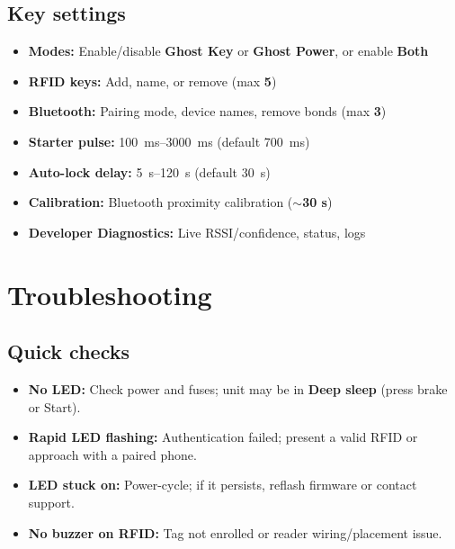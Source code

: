 \documentclass[11pt]{article}
\begin{document}
\subsection{Key settings}
\begin{itemize}
  \item \textbf{Modes:} Enable/disable \textbf{Ghost Key} or \textbf{Ghost Power}, or enable \textbf{Both}
  \item \textbf{RFID keys:} Add, name, or remove (max \textbf{5})
  \item \textbf{Bluetooth:} Pairing mode, device names, remove bonds (max \textbf{3})
  \item \textbf{Starter pulse:} \SI{100}{\milli\second}--\SI{3000}{\milli\second} (default \SI{700}{\milli\second})
  \item \textbf{Auto-lock delay:} \SI{5}{\second}--\SI{120}{\second} (default \SI{30}{\second})
  \item \textbf{Calibration:} Bluetooth proximity calibration (\(\sim\)\textbf{30 s})
  \item \textbf{Developer Diagnostics:} Live RSSI/confidence, status, logs
\end{itemize}

\section{Troubleshooting}
\subsection{Quick checks}
\begin{itemize}
  \item \textbf{No LED:} Check power and fuses; unit may be in \textbf{Deep sleep} (press brake or Start).
  \item \textbf{Rapid LED flashing:} Authentication failed; present a valid RFID or approach with a paired phone.
  \item \textbf{LED stuck on:} Power-cycle; if it persists, reflash firmware or contact support.
  \item \textbf{No buzzer on RFID:} Tag not enrolled or reader wiring/placement issue.
\end{itemize}
\end{document}
